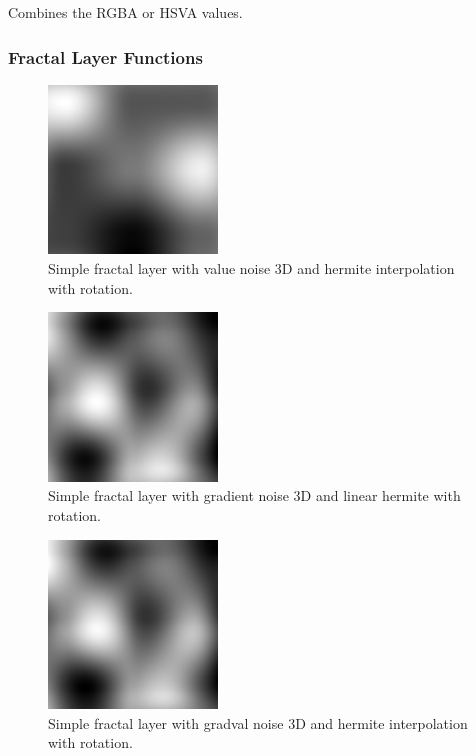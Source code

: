 Combines the RGBA or HSVA values.

\subsubsection{Fractal Layer Functions}

\begin{figure}[h]
\centering
\includegraphics[width=0.4\textwidth]{out/simpleFractalLayer3/simpleFractalLayer3_value_noise3D_hermiteInterp_rot.png}
\caption{Simple fractal layer with value noise 3D and hermite interpolation with rotation.}
\label{fig:simple_fractal_layer3_value_noise3D_hermiteInterp_rot}
\end{figure}

\begin{figure}[h]
\centering
\includegraphics[width=0.4\textwidth]{out/simpleFractalLayer3/simpleFractalLayer3_gradient_noise3D_hermiteInterp_rot.png}
\caption{Simple fractal layer with gradient noise 3D and linear hermite with rotation.}
\label{fig:simple_fractal_layer3_gradient_noise3D_hermiteInterp_rot}
\end{figure}

\begin{figure}[h]
\centering
\includegraphics[width=0.4\textwidth]{out/simpleFractalLayer3/simpleFractalLayer3_gradval_noise3D_hermiteInterp_rot.png}
\caption{Simple fractal layer with gradval noise 3D and hermite interpolation with rotation.}
\label{fig:simple_fractal_layer3_gradval_noise3D_hermiteInterp_rot}
\end{figure}

